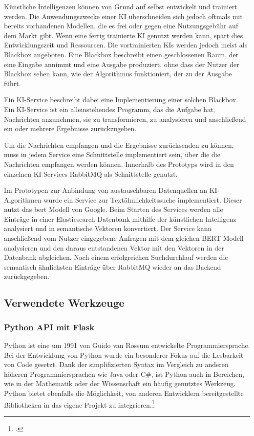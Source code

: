 Künstliche Intelligenzen können von Grund auf selbst entwickelt und trainiert werden. Die Anwendungszwecke einer KI überschneiden sich jedoch oftmals mit bereits vorhandenen Modellen, die es frei oder gegen eine Nutzungsgebühr auf dem Markt gibt. Wenn eine fertig trainierte KI genutzt werden kann, spart dies Entwicklungszeit und Ressourcen. Die vortrainierten KIs werden jedoch meist als Blackbox angeboten. Eine Blackbox beschreibt einen geschlossenen Raum, der eine Eingabe annimmt und eine Ausgabe produziert, ohne dass der Nutzer der Blackbox sehen kann, wie der Algorithmus funktioniert, der zu der Ausgabe führt.  

Ein KI-Service beschreibt dabei eine Implementierung einer solchen Blackbox. Ein KI-Service ist ein alleinstehendes Programm, das die Aufgabe hat, Nachrichten anzunehmen, sie zu transformieren, zu analysieren und anschließend ein oder mehrere Ergebnisse zurückzugeben. 

Um die Nachrichten empfangen und die Ergebnisse zurücksenden zu können, muss in jedem Service eine Schnittstelle implementiert sein, über die die Nachrichten empfangen werden können. Innerhalb des Prototyps wird in den einzelnen KI-Services RabbitMQ als Schnittstelle genutzt.

Im Prototypen zur Anbindung von austauschbaren Datenquellen an KI-Algorithmen wurde ein Service zur Textähnlichkeitssuche implementiert. Dieser nutzt das \ac{bert} Modell von Google. Beim Starten des Services werden alle Einträge in einer Elasticsearch Datenbank mithilfe der künstlichen Intelligenz analysiert und in semantische Vektoren konvertiert. Der Service kann anschließend vom Nutzer eingegebene Anfragen mit dem gleichen BERT Modell analysieren und den daraus entstandenen Vektor mit den Vektoren in der Datenbank abgleichen. Nach einem erfolgreichen Suchdurchlauf werden die semantisch ähnlichsten Einträge über RabbitMQ wieder an das Backend zurückgegeben.

\subsection{Verwendete Werkzeuge}
\subsubsection{Python API mit Flask}
Python ist eine um 1991 von Guido van Rossum entwickelte Programmiersprache. Bei der Entwicklung von Python wurde ein besonderer Fokus auf die Lesbarkeit von Code gesetzt. Dank der simplifizierten Syntax im Vergleich zu anderen höheren Programmiersprachen wie Java oder C\#, ist Python auch in Bereichen, wie in der Mathematik oder der Wissenschaft ein häufig genutztes Werkzeug. Python bietet ebenfalls die Möglichkeit, von anderen Entwicklern bereitgestellte Bibliotheken in das eigene Projekt zu integrieren.\footcite{python2021python} 

